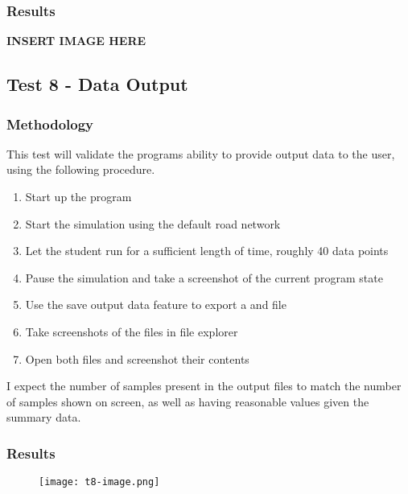         \subsubsection{Results}

            \textbf{INSERT IMAGE HERE}

    \subsection{Test 8 - Data Output}

        \subsubsection{Methodology}

            This test will validate the programs ability to provide output data to the user, using the following procedure.

            \begin{enumerate}
                \item Start up the program
                \item Start the simulation using the default road network
                \item Let the student run for a sufficient length of time, roughly 40 data points
                \item Pause the simulation and take a screenshot of the current program state
                \item Use the save output data feature to export a  and  file
                \item Take screenshots of the files in file explorer
                \item Open both files and screenshot their contents
            \end{enumerate}

            I expect the number of samples present in the output files to match the number of samples shown on screen, as well as having reasonable values given the summary data.

        \subsubsection{Results}

            \begin{figure}[ht]
                \centering
                \texttt{[image: t8-image.png]}
                \caption{}
                \label{testing:t8-image}
            \end{figure}


